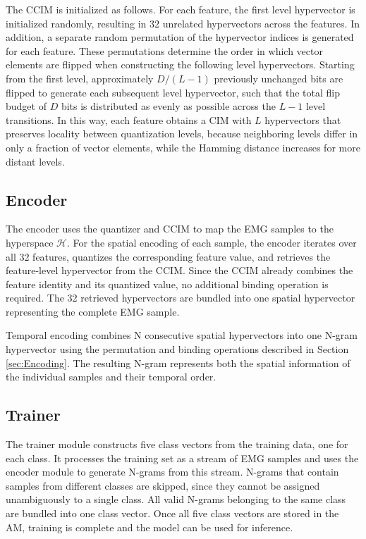         The CCIM is initialized as follows. For each feature, the first level hypervector is initialized randomly, resulting in 32 unrelated hypervectors across the features. In addition, a separate random permutation of the hypervector indices is generated for each feature. These permutations determine the order in which vector elements are flipped when constructing the following level hypervectors. Starting from the first level, approximately $D/(L-1)$ previously unchanged bits are flipped to generate each subsequent level hypervector, such that the total flip budget of $D$ bits is distributed as evenly as possible across the $L-1$ level transitions. In this way, each feature obtains a CIM with $L$ hypervectors that preserves locality between quantization levels, because neighboring levels differ in only a fraction of vector elements, while the Hamming distance increases for more distant levels.

        
        \subsection{Encoder}
        The encoder uses the quantizer and CCIM to map the EMG samples to the hyperspace $\mathcal{H}$. For the spatial encoding of each sample, the encoder iterates over all 32 features, quantizes the corresponding feature value, and retrieves the feature-level hypervector from the CCIM. Since the CCIM already combines the feature identity and its quantized value, no additional binding operation is required. The 32 retrieved hypervectors are bundled into one spatial hypervector representing the complete EMG sample.

        Temporal encoding combines N consecutive spatial hypervectors into one N-gram hypervector using the permutation and binding operations described in Section \ref{sec:Encoding}. The resulting N-gram represents both the spatial information of the individual samples and their temporal order.
            
        \subsection{Trainer}

        The trainer module constructs five class vectors from the training data, one for each class. It processes the training set as a stream of EMG samples and uses the encoder module to generate N-grams from this stream. N-grams that contain samples from different classes are skipped, since they cannot be assigned unambiguously to a single class. All valid N-grams belonging to the same class are bundled into one class vector. Once all five class vectors are stored in the AM, training is complete and the model can be used for inference.
        
